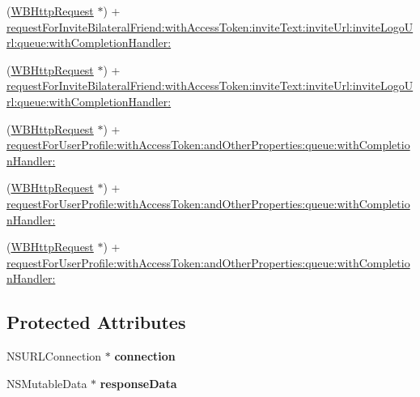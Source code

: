 \begin{DoxyCompactItemize}
\item 
(\mbox{\hyperlink{interface_w_b_http_request}{W\+B\+Http\+Request}} $\ast$) + \mbox{\hyperlink{interface_w_b_http_request_a82d133ab6df8bbd0b61a6bbdd56fa499}{request\+For\+Invite\+Bilateral\+Friend\+:with\+Access\+Token\+:invite\+Text\+:invite\+Url\+:invite\+Logo\+Url\+:queue\+:with\+Completion\+Handler\+:}}
\item 
(\mbox{\hyperlink{interface_w_b_http_request}{W\+B\+Http\+Request}} $\ast$) + \mbox{\hyperlink{interface_w_b_http_request_a82d133ab6df8bbd0b61a6bbdd56fa499}{request\+For\+Invite\+Bilateral\+Friend\+:with\+Access\+Token\+:invite\+Text\+:invite\+Url\+:invite\+Logo\+Url\+:queue\+:with\+Completion\+Handler\+:}}
\item 
(\mbox{\hyperlink{interface_w_b_http_request}{W\+B\+Http\+Request}} $\ast$) + \mbox{\hyperlink{interface_w_b_http_request_ac5c54cd942ec3972dce639a4a299d812}{request\+For\+User\+Profile\+:with\+Access\+Token\+:and\+Other\+Properties\+:queue\+:with\+Completion\+Handler\+:}}
\item 
(\mbox{\hyperlink{interface_w_b_http_request}{W\+B\+Http\+Request}} $\ast$) + \mbox{\hyperlink{interface_w_b_http_request_ac5c54cd942ec3972dce639a4a299d812}{request\+For\+User\+Profile\+:with\+Access\+Token\+:and\+Other\+Properties\+:queue\+:with\+Completion\+Handler\+:}}
\item 
(\mbox{\hyperlink{interface_w_b_http_request}{W\+B\+Http\+Request}} $\ast$) + \mbox{\hyperlink{interface_w_b_http_request_ac5c54cd942ec3972dce639a4a299d812}{request\+For\+User\+Profile\+:with\+Access\+Token\+:and\+Other\+Properties\+:queue\+:with\+Completion\+Handler\+:}}
\end{DoxyCompactItemize}
\subsection*{Protected Attributes}
\begin{DoxyCompactItemize}
\item 
\mbox{\label{interface_w_b_http_request_a724b90b2a99ed52ade7a065cebdb607f}} 
N\+S\+U\+R\+L\+Connection $\ast$ {\bfseries connection}
\item 
\mbox{\label{interface_w_b_http_request_a723f660fea3dc0866bdc7cb05545bcd9}} 
N\+S\+Mutable\+Data $\ast$ {\bfseries response\+Data}
\end{DoxyCompactItemize}
